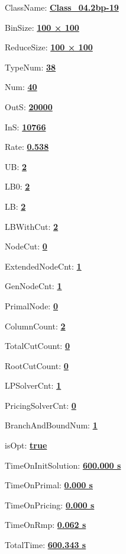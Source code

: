 \documentclass[11pt]{article}
\begin{document}
\pagestyle{empty}


ClassName: \underline{\textbf{Class_04.2bp-19}}
\par
BinSize: \underline{\textbf{100 × 100}}
\par
ReduceSize: \underline{\textbf{100 × 100}}
\par
TypeNum: \underline{\textbf{38}}
\par
Num: \underline{\textbf{40}}
\par
OutS: \underline{\textbf{20000}}
\par
InS: \underline{\textbf{10766}}
\par
Rate: \underline{\textbf{0.538}}
\par
UB: \underline{\textbf{2}}
\par
LB0: \underline{\textbf{2}}
\par
LB: \underline{\textbf{2}}
\par
LBWithCut: \underline{\textbf{2}}
\par
NodeCut: \underline{\textbf{0}}
\par
ExtendedNodeCnt: \underline{\textbf{1}}
\par
GenNodeCnt: \underline{\textbf{1}}
\par
PrimalNode: \underline{\textbf{0}}
\par
ColumnCount: \underline{\textbf{2}}
\par
TotalCutCount: \underline{\textbf{0}}
\par
RootCutCount: \underline{\textbf{0}}
\par
LPSolverCnt: \underline{\textbf{1}}
\par
PricingSolverCnt: \underline{\textbf{0}}
\par
BranchAndBoundNum: \underline{\textbf{1}}
\par
isOpt: \underline{\textbf{true}}
\par
TimeOnInitSolution: \underline{\textbf{600.000 s}}
\par
TimeOnPrimal: \underline{\textbf{0.000 s}}
\par
TimeOnPricing: \underline{\textbf{0.000 s}}
\par
TimeOnRmp: \underline{\textbf{0.062 s}}
\par
TotalTime: \underline{\textbf{600.343 s}}
\par
\newpage
\end{document}
